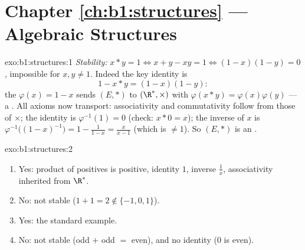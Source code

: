 \section*{Chapter \ref{ch:b1:structures} --- Algebraic Structures}

\begin{solution}{exo:b1:structures:1}
\emph{Stability:} $x * y = 1 \iff x + y - xy = 1 \iff (1-x)(1-y) = 0$,
impossible for $x, y \neq 1$. Indeed the key identity is
\[
1 - x * y = (1 - x)(1 - y):
\]
the  $\varphi(x) = 1 - x$ sends $(E, *)$ to $(\R^*, \times)$ with
$\varphi(x * y) = \varphi(x)\varphi(y)$ --- a  . All
axioms now transport: associativity and commutativity follow from
those of $\times$; the identity is $\varphi^{-1}(1) = 0$ (check: $x *
0 = x$); the inverse of $x$ is $\varphi^{-1}\bigl((1-x)^{-1}\bigr) =
1 - \frac{1}{1-x} = \frac{x}{x - 1}$ (which is $\neq 1$). So $(E, *)$
is an .
\end{solution}

\begin{solution}{exo:b1:structures:2}
\begin{enumerate}
  \item Yes: product of positives is positive, identity $1$, inverse
        $\frac 1x$, associativity inherited from $\R^*$.
  \item No: not stable ($1 + 1 = 2 \notin \{-1,0,1\}$).
  \item Yes: the standard example.
  \item No: not stable (odd $+$ odd $=$ even), and no identity ($0$ is
        even).
\end{enumerate}
\end{solution}

